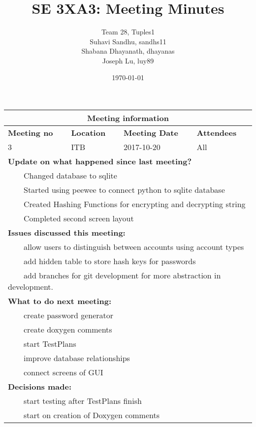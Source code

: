 \documentclass{article}
\title{SE 3XA3: Meeting Minutes}
\author{Team 28, Tuples1
		\\ Suhavi Sandhu, sandhs11
		\\ Shabana Dhayanath, dhayanas
		\\ Joseph Lu, luy89
}
\date{\today}
\newcommand{\tabitem}{~~\llap{\textbullet}~~}
\begin{document}
\begin{tabularx}{\textwidth}{| X || X || X || X |}
    \hline
    \hline
    \multicolumn{4}{|c|}{\textbf{Meeting information}}\\
    \hline
    \hline
        
    \textbf{Meeting no}& \textbf{Location}&\textbf{Meeting Date}&\textbf{Attendees}\\
    
    \hline

    3 & ITB & 2017-10-20 & All\\
    
    \hline

    \multicolumn{4}{|l|}{\textbf{Update on what happened since last meeting?}}\\

    \multicolumn{4}{|l|}{\tabitem Changed database to sqlite}\\
    \multicolumn{4}{|l|}{\tabitem Started using peewee to connect python to sqlite database}\\
    \multicolumn{4}{|l|}{\tabitem Created Hashing Functions for encrypting and decrypting string}\\
    \multicolumn{4}{|l|}{\tabitem Completed second screen layout}\\

    \hline

    \multicolumn{4}{|l|}{\textbf{Issues discussed this meeting:}}\\
    
    \multicolumn{4}{|l|}{\tabitem allow users to distinguish between accounts using account types}\\
    \multicolumn{4}{|l|}{\tabitem add hidden table to store hash keys for passwords}\\
    \multicolumn{4}{|l|}{\tabitem add branches for git development for more abstraction in development.}\\

    \hline

    \multicolumn{4}{|l|}{\textbf{What to do next meeting:}}\\

    \multicolumn{4}{|l|}{\tabitem create password generator}\\
    \multicolumn{4}{|l|}{\tabitem create doxygen comments}\\
    \multicolumn{4}{|l|}{\tabitem start TestPlans}\\
    \multicolumn{4}{|l|}{\tabitem improve database relationships}\\
    \multicolumn{4}{|l|}{\tabitem connect screens of GUI}\\

    \hline

    \multicolumn{4}{|l|}{\textbf{Decisions made:}}\\
    
    \multicolumn{4}{|l|}{\tabitem start testing after TestPlans finish}\\
    \multicolumn{4}{|l|}{\tabitem start on creation of Doxygen comments}\\

    \hline


\end{tabularx}
\end{document}
